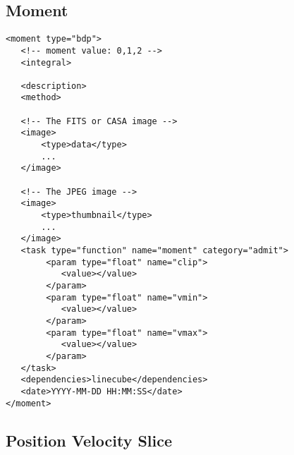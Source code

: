 \documentclass{article}
\begin{document}
\subsection{Moment}
\footnotesize
\begin{verbatim}
<moment type="bdp">
   <!-- moment value: 0,1,2 -->
   <integral>          

   <description>
   <method>

   <!-- The FITS or CASA image -->
   <image> 
       <type>data</type>
       ...
   </image>  

   <!-- The JPEG image -->
   <image> 
       <type>thumbnail</type>
       ...
   </image>  
   <task type="function" name="moment" category="admit">
        <param type="float" name="clip">
           <value></value>
        </param>
        <param type="float" name="vmin">
           <value></value>
        </param>
        <param type="float" name="vmax">
           <value></value>
        </param>
   </task>
   <dependencies>linecube</dependencies>
   <date>YYYY-MM-DD HH:MM:SS</date>
</moment>
\end{verbatim}

\subsection{Position Velocity Slice}
\footnotesize
\begin{verbatim}
\end{verbatim}
\end{document}
